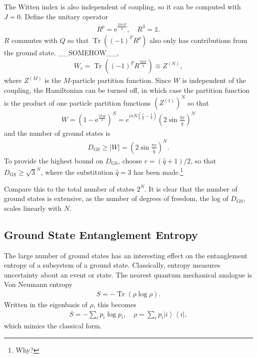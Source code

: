 \documentclass[12pt]{article} %
\newcommand{\abs}[1]{\left|#1\right|}
\renewcommand{\th}[1]{\frac{1}{#1}}
\newcommand{\e}{\text{e}}
\newcommand{\ket}[1]{\left|#1\right\rangle}
\newcommand{\bra}[1]{\left\langle#1\right|}
\DeclareMathOperator{\Tr}{Tr}
\begin{document}
The Witten index is also independent of coupling, so it can be computed with $J=0$. Define the unitary operator 
\begin{align}
R^p = \e^{\frac{2\pi irF}{\hat q}},\quad R^3 = \mathbb{1}.
\end{align}
$R$ commutes with $Q$ so that $\Tr\left((-1)^FR^p\right)$ also only has contributions from the ground state. \_\_SOMEHOW\_\_,
\begin{align}
W_r = \Tr\left((-1)^FR^\frac{2\pi ir}{\hat q}\right) \equiv Z^{(N)},
\end{align}
where $Z^{(M)}$ is the $M$-particle partition function. Since $W$ is independent of the coupling, the Hamiltonian can be turned off, in which case the partition function is the product of one particle partition functions $\left(Z^{(1)}\right)^N$ so that 
\begin{align}
W = \left(1-\e^{\frac{2\pi ip}{3}}\right)^N = e^{i\pi N\left(\frac{r}{\hat q} - \th{2}\right)}\left(2\sin\frac{\pi r}{\hat q}\right)^N
\end{align}
and the number of ground states is 
\begin{align}
D_\text{GS} \ge \abs{W} = \left(2\sin\frac{\pi r}{\hat q}\right)^N. \label{eqn:dgs}
\end{align}
To provide the highest bound on $D_\text{GS}$, choose $r = (\hat q+1)/2$, so that $D_\text{GS} \ge \sqrt{3}^N$, where the substitution $\hat q = 3$ has been made.\footnote{Why?}

Compare this to the total number of states $2^N$. It is clear that the number of ground states is extensive, as the number of degrees of freedom, the log of $D_\text{GS}$, scales linearly with $N$.

\subsection{Ground State Entanglement Entropy} \emph{}

The large number of ground states has an interesting effect on the entanglement entropy of a subsystem of a ground state. Classically, entropy measures uncertainty about an event or state. The nearest quantum mechanical analogue is Von Neumann entropy
\begin{align}
S = -\Tr(\rho\log\rho).\label{eqn:vnent}
\end{align}
Written in the eigenbasis of $\rho$, this becomes 
\begin{align}
S = -\sum_ip_i\log p_i,\quad \rho = \sum_i p_i\ket{i}\bra{i},
\end{align}
which mimics the classical form.
\end{document}
